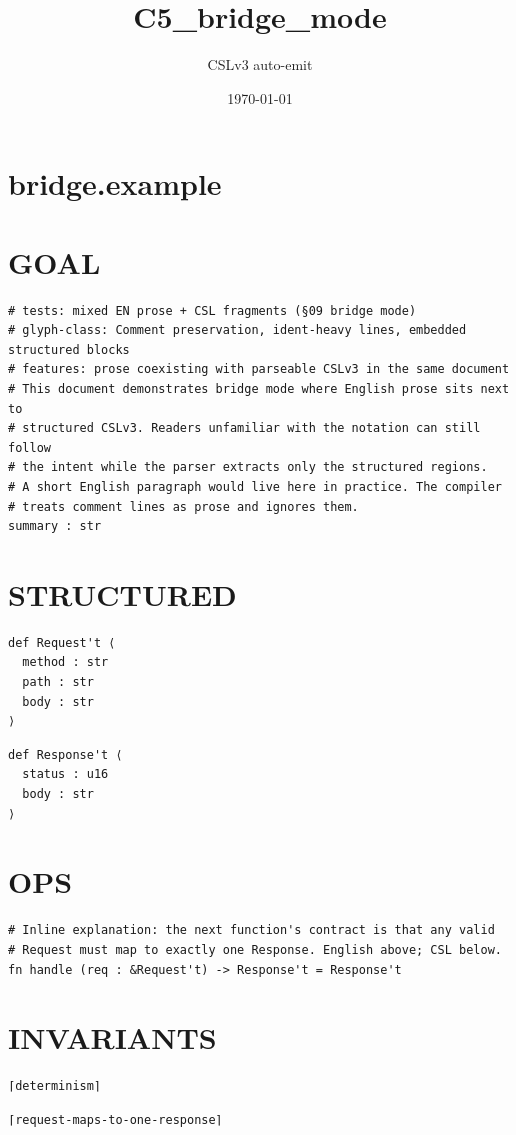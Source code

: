 \documentclass[11pt]{article}
\title{C5\_bridge\_mode}
\author{CSLv3 auto-emit}
\date{\today}
\begin{document}
\maketitle
\tableofcontents

\section{bridge.example}\label{sec:bridgeexample}
\section{GOAL}\label{sec:goal}
\begin{lstlisting}[language=csl]
# tests: mixed EN prose + CSL fragments (§09 bridge mode)
# glyph-class: Comment preservation, ident-heavy lines, embedded structured blocks
# features: prose coexisting with parseable CSLv3 in the same document
# This document demonstrates bridge mode where English prose sits next to
# structured CSLv3. Readers unfamiliar with the notation can still follow
# the intent while the parser extracts only the structured regions.
# A short English paragraph would live here in practice. The compiler
# treats comment lines as prose and ignores them.
summary : str
\end{lstlisting}
\section{STRUCTURED}\label{sec:structured}
\begin{lstlisting}[language=csl]
def Request't ⟨
  method : str
  path : str
  body : str
⟩
\end{lstlisting}
\begin{lstlisting}[language=csl]
def Response't ⟨
  status : u16
  body : str
⟩
\end{lstlisting}
\section{OPS}\label{sec:ops}
\begin{lstlisting}[language=csl]
# Inline explanation: the next function's contract is that any valid
# Request must map to exactly one Response. English above; CSL below.
fn handle (req : &Request't) -> Response't = Response't
\end{lstlisting}
\section{INVARIANTS}\label{sec:invariants}
\begin{lstlisting}[language=csl]
⌈determinism⌉
\end{lstlisting}
\begin{lstlisting}[language=csl]
⌈request-maps-to-one-response⌉
\end{lstlisting}
\end{document}
